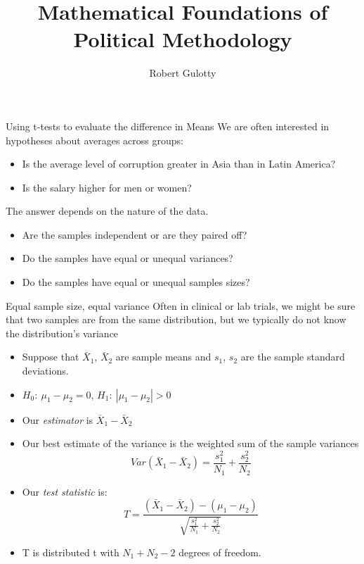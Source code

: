 \documentclass{beamer}
\title[PLSC 43401]{Mathematical Foundations of Political Methodology}
\author{Robert Gulotty}
\institute[Chicago]{University of Chicago}
\numberwithin{equation}{section}
\begin{document}
\begin{frame}
\maketitle
\end{frame}



\begin{frame}{Using t-tests to evaluate the difference in Means}
We are often interested in hypotheses about averages across groups:\pause
\begin{itemize}
\item Is the average level of corruption greater in Asia than in Latin America?\pause
\item Is the salary higher for men or women?\pause
\end{itemize}
The answer depends on the nature of the data.\pause
\begin{itemize}
\item Are the samples independent or are they paired off?\pause
\item Do the samples have equal or unequal variances?\pause
\item Do the samples have equal or unequal samples sizes?
\end{itemize}

\end{frame}




\begin{frame}{Equal sample size, equal variance}
Often in clinical or lab trials, we might be sure that two samples are from the same distribution, but we typically do not know the distribution's variance\pause
\begin{itemize}

\item Suppose that $\bar{X}_1$, $\bar{X}_2$ are sample means and $s_1$, $s_2$ are the sample standard deviations.\pause
\item $H_0:\ \mu_1-\mu_2=0$,  $H_1:\ |\mu_1-\mu_2|>0$\pause
\item Our \emph{estimator} is $\bar{X}_1-\bar{X}_2$\pause
\item Our best estimate of the variance is the weighted sum of the sample variances\pause
$$Var(\bar{X}_1-\bar{X}_2)=\frac{s_1^2}{N_1}+\frac{s_2^2}{N_2}$$\pause
\item Our \emph{test statistic} is:\pause
$$T=\frac{(\bar{X}_1-\bar{X}_2)-(\mu_1-\mu_2)}{\sqrt{\frac{s_1^2}{N_1}+\frac{s_2^2}{N_2}}}$$
\item T is distributed t with $N_1+N_2-2$ degrees of freedom.

\end{itemize}
\end{frame}
\end{document}
